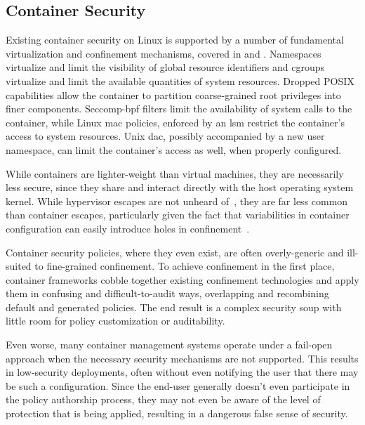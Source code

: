\subsection{Container Security}%
\label{ss:container-security-bg}

Existing container security on Linux is supported by a number of fundamental
virtualization and confinement mechanisms, covered in  and
. Namespaces virtualize and limit the visibility of global
resource identifiers and cgroups virtualize and limit the available quantities of system
resources. Dropped POSIX capabilities allow the container to partition coarse-grained root
privileges into finer components. Seccomp-bpf filters limit the availability of system
calls to the container, while Linux \gls{mac} policies, enforced by an \gls{lsm} restrict
the container's access to system resources. Unix \gls{dac}, possibly accompanied by a new
user namespace, can limit the container's access as well, when properly configured.

\begin{inprogress}

  While containers are lighter-weight than virtual machines, they are necessarily less
  secure, since they share and interact directly with the host operating system kernel.
  While hypervisor escapes are not unheard of~, they are far less common than
  container escapes, particularly given the fact that variabilities in container
  configuration can easily introduce holes in
  confinement~\cite{sultan2019_container_security}.

  Container security policies, where they even exist, are often overly-generic and
  ill-suited to fine-grained confinement. To achieve confinement in the first place,
  container frameworks cobble together existing confinement technologies and apply them in
  confusing and difficult-to-audit ways, overlapping and recombining default and generated
  policies. The end result is a complex security soup with little room for policy
  customization or auditability. 

  Even worse, many container management systems operate under a fail-open approach when the
  necessary security mechanisms are not supported. This results in low-security deployments,
  often without even notifying the user that there may be such a configuration. Since the
  end-user generally doesn't even participate in the policy authorship process, they may not
  even be aware of the level of protection that is being applied, resulting in a dangerous
  false sense of security. 
\end{inprogress}

